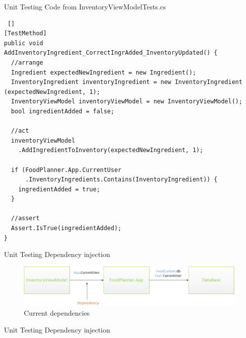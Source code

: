 \begin{frame} [fragile] {Unit Testing} {Code from InventoryViewModelTests.cs}

\begin{lstlisting} []
[TestMethod]
public void
AddInventoryIngredient_CorrectIngrAdded_InventoryUpdated() {
  //arrange
  Ingredient expectedNewIngredient = new Ingredient();
  InventoryIngredient inventoryIngredient = new InventoryIngredient (expectedNewIngredient, 1);
  InventoryViewModel inventoryViewModel = new InventoryViewModel();
  bool ingredientAdded = false;
  
  //act
  inventoryViewModel
    .AddIngredientToInventory(expectedNewIngredient, 1);
  
  if (FoodPlanner.App.CurrentUser
      .InventoryIngredients.Contains(InventoryIngredient)) {
    ingredientAdded = true;
  }
    
  //assert
  Assert.IsTrue(ingredientAdded);
}
\end{lstlisting}

\end{frame}

\begin{frame} {Unit Testing} {Dependency injection}

\begin{figure}
\includegraphics[width = \textwidth] {graphics/currentDependency.png}
\caption{Current dependencies}
\end{figure}
\end{frame}

\begin{frame} {Unit Testing} {Dependency injection}

\end{frame}